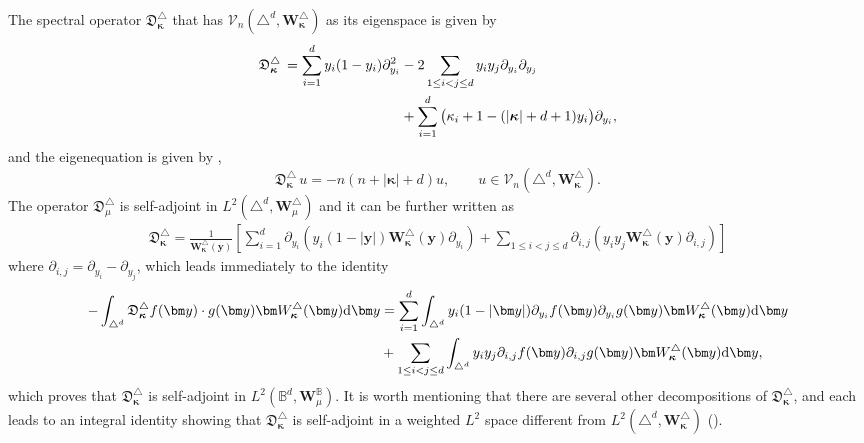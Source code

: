\documentclass{amsart}
\theoremstyle{remark}
\def\d{\mathrm{d}}
\def\fD{{\mathfrak D}}
\def\k{{\kappa}}
\def\Wb{{\bm W}}
\def\CV{{\mathcal V}}
\def\BB{{\mathbb B}}
\def\bk{{\boldsymbol{\kappa}}}
\begin{document}
The spectral operator $\fD_\bk^\triangle$ that has $\CV_n\left(\triangle^d, \bm W_\bk^\triangle\right)$ as its eigenspace is given by
\begin{align}\label{eq:D-simplex}
  \fD_\bk^\triangle \, =  \sum_{i=1}^d y_i(1-y_i)  \partial_{y_i}^2 
    & - 2 \sum_{1 \le i< j \le d} y_i y_j  \partial_{y_i}\partial_{y_j} \\
    &  + \sum_{i=1}^d \big(\k_i +1 - (|\bk|+d+1) y_i \big)  \partial_{y_i},\notag
\end{align} 
and the eigenequation is given by \cite[Section 5.3]{DX}, 
\begin{equation}\label{eq:Dk-eigen}
   \fD_\bk^\triangle\, u = - n (n+|\bk| + d) u, \qquad u \in \CV_n\left(\triangle^d, \bm W_\bk^\triangle \right).
\end{equation}
The operator $\fD_\mu^\triangle$ is self-adjoint in $L^2(\triangle^d, \bm W_\mu^\triangle)$ and it can be further written as
 \begin{align}\label{eq:DkSimplex2}
\fD_\bk^\triangle = \frac{1}{\bm W_\bk^\triangle(\bm y)} \left[
   \sum_{i=1}^d \partial_{y_i} \left( y_i (1-|\bm y|) \bm W_\bk^\triangle(\bm y) \partial_{y_i}\right)
   + \sum_{1\le i< j \le d} \partial_{i,j} \left( y_i y_j \bm W_{\bk}^\triangle(\bm y) \partial_{i,j} \right) 
\right] 
\end{align}
where $\partial_{i,j} = \partial_{y_i} - \partial_{y_j}$, which leads immediately to the identity
 \begin{align}\label{eq:DkSimplex3}
   - \int_{\triangle^d} \fD_\bk^\triangle f(\bm y) \cdot g(\bm y) \bm W_\bk^\triangle(\bm y) \d \bm y 
& =    \sum_{i=1}^d   \int_{\triangle^d} y_i (1-|\bm y|) \partial_{y_i}  f(\bm y) \partial_{y_i}  g(\bm y) 
  \bm W_\bk^\triangle(\bm y) \d \bm y \\
 &  + \sum_{1\le i< j \le d}  \int_{\triangle^d} y_i y_j  \partial_{i,j} f(\bm y) \partial_{i,j} g(\bm y) \bm W_\bk^\triangle(\bm y) \d \bm y, \notag 
\end{align}
which proves that $\fD_\bk^\triangle$ is self-adjoint in $L^2(\BB^d, \Wb_\mu^\BB)$. 
It is worth mentioning that there are several other decompositions of $\fD_\bk^\triangle$, and each leads to an integral
identity showing that $\fD_\bk^\triangle$ is self-adjoint in a weighted $L^2$ space different from 
$L^2(\triangle^d, \bm W_\bk^\triangle)$ (\cite{GX, X23b}).  
 
\end{document}
